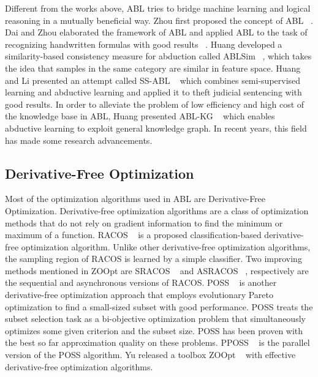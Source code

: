 Different from the works above, ABL tries to bridge machine learning and logical reasoning in a mutually beneficial way. Zhou first proposed the concept of ABL ~\cite{zhou2019abductive}. Dai and Zhou elaborated the framework of ABL and applied ABL to the task of recognizing handwritten formulas with good results ~\cite{dai2019bridging}. Huang developed a similarity-based consistency measure for abduction called ABLSim ~\cite{huang2021fast}, which takes the idea that samples in the same category are similar in feature space. Huang and Li presented an attempt called SS-ABL ~\cite{huang2020semi} which combines semi-supervised learning and abductive learning and applied it to theft judicial sentencing with good results. In order to alleviate the problem of low efficiency and high cost of the knowledge base in ABL, Huang presented ABL-KG ~\cite{huang2023enabling} which enables abductive learning to exploit general knowledge graph. In recent years, this field has made some research advancements.
\subsection{Derivative-Free Optimization} 
Most of the optimization algorithms used in ABL are Derivative-Free Optimization. Derivative-free optimization algorithms are a class of optimization methods that do not rely on gradient information to find the minimum or maximum of a function. RACOS ~\cite{yu2016derivative} is a proposed classification-based derivative-free optimization algorithm. Unlike other derivative-free optimization algorithms, the sampling region of RACOS is learned by a simple classifier. Two improving methods mentioned in ZOOpt are SRACOS ~\cite{hu2017sequential} and ASRACOS ~\cite{liu2019asynchronous},  respectively are the sequential and asynchronous versions of RACOS. POSS ~\cite{NIPS2015_b4d168b4} is another derivative-free optimization approach that employs evolutionary Pareto optimization to find a small-sized subset with good performance. POSS treats the subset selection task as a bi-objective optimization problem that simultaneously optimizes some given criterion and the subset size. POSS has been proven with the best so far approximation quality on these problems. PPOSS ~\cite{qian2016parallel} is the parallel version of the POSS algorithm.
Yu released a toolbox ZOOpt ~\cite{Liu_2022} with effective derivative-free optimization algorithms.